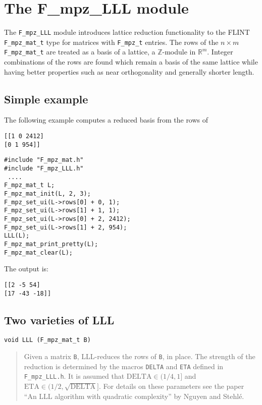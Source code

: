 \documentclass[a4paper,10pt]{article}
\newcommand{\Z}{\mathbb{Z}}
\newcommand{\R}{\mathbb{R}}
\newcommand{\code}{\lstinline}
\begin{document}
\section{The F\_mpz\_LLL module}

The \code{F_mpz_LLL} module introduces lattice reduction functionality to the FLINT \code{F_mpz_mat_t} type for matrices with \code{F_mpz_t} entries.  The rows of the $n \times m$ \code{F_mpz_mat_t} are treated as a basis of a lattice, a $\Z$-module in $\R^{m}$.  Integer combinations of the rows are found which remain a basis of the same lattice while having better properties such as near orthogonality and 
generally shorter length.

\subsection{Simple example}

The following example computes a reduced basis from the rows of 
\begin{lstlisting}
[[1 0 2412]
[0 1 954]]
\end{lstlisting} 

\begin{lstlisting}
#include "F_mpz_mat.h"
#include "F_mpz_LLL.h"
 ....
F_mpz_mat_t L;
F_mpz_mat_init(L, 2, 3);
F_mpz_set_ui(L->rows[0] + 0, 1);
F_mpz_set_ui(L->rows[1] + 1, 1);
F_mpz_set_ui(L->rows[0] + 2, 2412);
F_mpz_set_ui(L->rows[1] + 2, 954);
LLL(L);
F_mpz_mat_print_pretty(L);
F_mpz_mat_clear(L);
\end{lstlisting}

The output is:

\begin{lstlisting}
[[2 -5 54]
[17 -43 -18]]
\end{lstlisting}

\subsection{Two varieties of LLL}

\begin{lstlisting}
void LLL (F_mpz_mat_t B)
\end{lstlisting}

\begin{quote}
Given a matrix \code{B}, LLL-reduces the rows of \code{B}, in place.  The strength of the reduction is 
determined by the macros \code{DELTA} and \code{ETA} defined in \code{F_mpz_LLL.h}.  It is assumed that 
$\mbox{DELTA} \in (1/4, 1]$ and $\mbox{ETA} \in (1/2, \sqrt{\mbox{DELTA}}]$.  For details on these parameters
 see the paper ``An LLL algorithm with quadratic complexity'' by Nguyen and Stehl\'e.
\end{quote}
\end{document}
